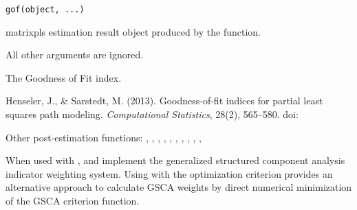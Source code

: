 \documentclass[a4paper]{book}
\begin{document}
%
\begin{Usage}
\begin{verbatim}
gof(object, ...)
\end{verbatim}
\end{Usage}
%
\begin{Arguments}
\begin{ldescription}
\item[\code{object}] matrixpls estimation result object produced by the  function.

\item[\code{...}] All other arguments are ignored.
\end{ldescription}
\end{Arguments}
%
\begin{Value}
The Goodness of Fit index.
\end{Value}
%
\begin{References}\relax
Henseler, J., \& Sarstedt, M. (2013). Goodness-of-fit indices for partial least
squares path modeling. \emph{Computational Statistics}, 28(2), 565–580. 
doi:\nobreakspace{}
\end{References}
%
\begin{SeeAlso}\relax
Other post-estimation functions: 
,
,
,
,
,
,
,
,
,
,
\end{SeeAlso}
%
\begin{Description}\relax
When used with ,  and 
 implement the generalized structured component analysis
indicator weighting system. Using  with the
 optimization criterion provides an alternative
approach to calculate GSCA weights by direct numerical minimization of the
GSCA criterion function.
\end{Description}
%
\end{document}
